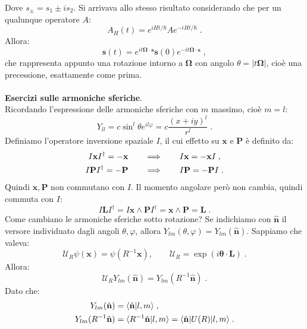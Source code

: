 \documentclass[12pt,a4paper]{report}
\theoremstyle{definition}
\numberwithin{equation}{section}
\newcommand{\bra}{\langle}
\newcommand{\ket}{\rangle}
\newcommand{\adj}[1]{#1^{\dagger}}
\begin{document}
Dove $s_{\pm}=s_1\pm is_2$. Si arrivava allo stesso risultato considerando che per un qualunque operatore $A$:
\begin{equation}
A_H(t)=e^{iHt/\hbar}Ae^{-iHt/\hbar}\;.
\end{equation}
Allora:
\begin{equation}
\mathbf{s}(t)=e^{it\boldsymbol{\Omega}\cdot\mathbf{s}}\mathbf{s}(0)e^{-it\boldsymbol{\Omega}\cdot\mathbf{s}}\;,
\end{equation}
che rappresenta appunto una rotazione intorno a $\boldsymbol{\Omega}$ con angolo $\theta=|t\boldsymbol{\Omega}|$, cioè una precessione, esattamente come prima. \\
\\
\textbf{Esercizi sulle armoniche sferiche}. \\
Ricordando l'espressione delle armoniche sferiche con $m$ massimo, cioè $m=l$:
\begin{equation}
Y_{ll}=c\sin^l\theta e^{il\varphi}=c\frac{(x+iy)^l}{r^l}\;.
\end{equation}
Definiamo l'operatore inversione spaziale $I$, il cui effetto su $\mathbf{x}$ e $\mathbf{P}$ è definito da:
\begin{align}
I\mathbf{x}\adj{I}=-\mathbf{x} \qquad &\Longrightarrow \qquad I\mathbf{x}=-\mathbf{x}I\;, \notag \\
I\mathbf{P}\adj{I}=-\mathbf{P} \qquad &\Longrightarrow \qquad I\mathbf{P}=-\mathbf{P}I\;.
\end{align}
Quindi $\mathbf{x},\mathbf{P}$ non commutano con $I$. Il momento angolare però non cambia, quindi commuta con $I$:
\begin{equation}
I\mathbf{L}\adj{I}=I\mathbf{x}\wedge\mathbf{P}\adj{I}=\mathbf{x}\wedge\mathbf{P}=\mathbf{L}\;.
\end{equation}
Come cambiano le armoniche sferiche sotto rotazione? Se indichiamo con $\hat{\mathbf{n}}$ il versore individuato dagli angoli $\theta,\varphi$, allora $Y_{lm}(\theta,\varphi)=Y_{lm}(\hat{\mathbf{n}})$. Sappiamo che valeva:
\begin{equation}
\mathcal{U}_R\psi(\mathbf{x})=\psi(R^{-1}\mathbf{x}),\qquad \mathcal{U}_R=\exp(i\boldsymbol{\theta}\cdot\mathbf{L})\;.
\end{equation}
Allora:
\begin{equation}
\mathcal{U}_RY_{lm}(\hat{\mathbf{n}})=Y_{lm}(R^{-1}\hat{\mathbf{n}})\;.
\end{equation}
Dato che:
\begin{align}
Y_{lm}(\hat{\mathbf{n}}) &= \bra\hat{\mathbf{n}}|l,m\ket\;, \notag \\
Y_{lm}(R^{-1}\hat{\mathbf{n}}) &= \bra R^{-1}\hat{\mathbf{n}}|l,m\ket=\bra\hat{\mathbf{n}}|U(R)|l,m\ket\;.
\end{align}
\end{document}
